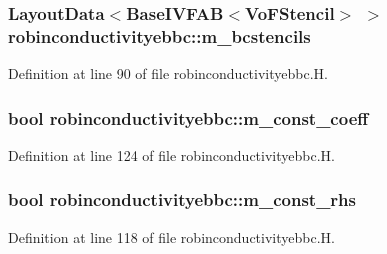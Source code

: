 \subsubsection[{\texorpdfstring{m\+\_\+bcstencils}{m_bcstencils}}]{\setlength{\rightskip}{0pt plus 5cm}Layout\+Data$<$Base\+I\+V\+F\+AB$<$Vo\+F\+Stencil$>$ $>$ robinconductivityebbc\+::m\+\_\+bcstencils\hspace{0.3cm}{\ttfamily [protected]}}\hypertarget{classrobinconductivityebbc_ab9f762584c2f02f35c3130e90eb1c447}{}\label{classrobinconductivityebbc_ab9f762584c2f02f35c3130e90eb1c447}


Definition at line 90 of file robinconductivityebbc.\+H.

\subsubsection[{\texorpdfstring{m\+\_\+const\+\_\+coeff}{m_const_coeff}}]{\setlength{\rightskip}{0pt plus 5cm}bool robinconductivityebbc\+::m\+\_\+const\+\_\+coeff\hspace{0.3cm}{\ttfamily [protected]}}\hypertarget{classrobinconductivityebbc_ad8c034a3b88613c17e7452ede327e963}{}\label{classrobinconductivityebbc_ad8c034a3b88613c17e7452ede327e963}


Definition at line 124 of file robinconductivityebbc.\+H.

\subsubsection[{\texorpdfstring{m\+\_\+const\+\_\+rhs}{m_const_rhs}}]{\setlength{\rightskip}{0pt plus 5cm}bool robinconductivityebbc\+::m\+\_\+const\+\_\+rhs\hspace{0.3cm}{\ttfamily [protected]}}\hypertarget{classrobinconductivityebbc_a74a75a706093aff198143fce91fcbed8}{}\label{classrobinconductivityebbc_a74a75a706093aff198143fce91fcbed8}


Definition at line 118 of file robinconductivityebbc.\+H.

